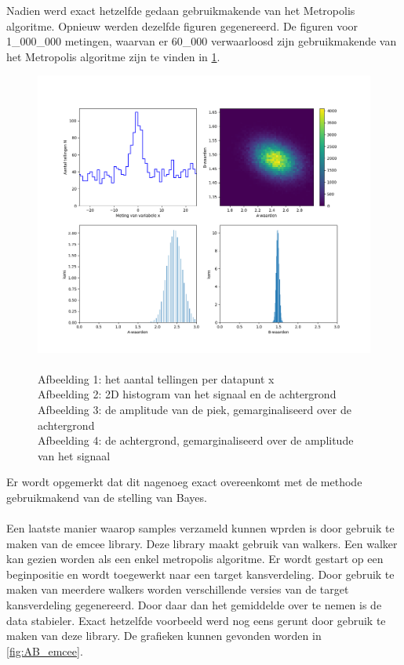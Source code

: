 Nadien werd exact hetzelfde gedaan gebruikmakende van het Metropolis algoritme. Opnieuw werden dezelfde figuren gegenereerd. De figuren voor 1\_000\_000 metingen, waarvan er 60\_000 verwaarloosd zijn gebruikmakende van het Metropolis algoritme zijn te vinden in \cref{fig:AB-metropolis}.
\begin{figure}
    \centering
    \includegraphics[width=0.95\linewidth]{Figures/signaal_AB_samples_1000000.png}
    \caption{\\Afbeelding 1: het aantal tellingen per datapunt x\\
    Afbeelding 2: 2D histogram van het signaal en de achtergrond \\
    Afbeelding 3: de amplitude van de piek, gemarginaliseerd over de achtergrond\\
    Afbeelding 4: de achtergrond, gemarginaliseerd over de amplitude van het signaal}
    \label{fig:AB-metropolis}
\end{figure}
Er wordt opgemerkt dat dit nagenoeg exact overeenkomt met de methode gebruikmakend van de stelling van Bayes. \\ \\Een laatste manier waarop samples verzameld kunnen wprden is door gebruik te maken van de emcee library. Deze library maakt gebruik van walkers. Een walker kan gezien worden als een enkel metropolis algoritme. Er wordt gestart op een beginpositie en wordt toegewerkt naar een target kansverdeling. Door gebruik te maken van meerdere walkers worden verschillende versies van de target kansverdeling gegenereerd. Door daar dan het gemiddelde over te nemen is de data stabieler. Exact hetzelfde voorbeeld werd nog eens gerunt door gebruik te maken van deze library. De grafieken kunnen gevonden worden in \cref{fig:AB_emcee}.
